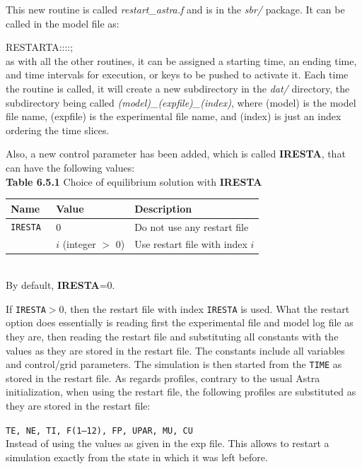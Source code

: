This new routine is called {\it restart\_astra.f} and is in the {\it sbr/} 
package. 
It can be called in the model file as:

RESTARTA::::;
\\
as with all the other routines, it can be assigned a starting time, an ending 
time, and time intervals for execution, or keys to be pushed to activate it.
Each time the routine is called, it will create a new subdirectory in the {\it 
dat/} directory, the subdirectory being called {\it 
(model)\_(expfile)\_(index)}, where (model) is the model file name, (expfile) 
is the experimental file name, and (index) is just an index ordering the time 
slices.

Also, a new control parameter has been added, which is called {\bf IRESTA}, that can have the following values:
\\
{\bf Table 6.5.1} Choice of equilibrium solution with {\bf IRESTA}\\[2ex]
\begin{tabular}{|l|l|l|}					\hline
\bf Name	&\bf Value & Description\\ \hline
\tt IRESTA 	& 0 & Do not use any restart file\\
\tt  	& $i$ (integer $>$ 0) &  Use restart file with index $i$\\ 
\hline
\end{tabular}
\bigskip\\
By default, {\bf IRESTA}=0.

If {\tt IRESTA}$>$0, then the restart file with index {\tt IRESTA} is used. What
the restart option does essentially is reading first the experimental file and 
model log file as they are, then reading the restart file and substituting all 
constants with the values as they are stored in the restart file. The constants 
include all variables and control/grid parameters. The simulation is then 
started from the {\tt TIME} as stored in the restart file.
As regards profiles, contrary to the usual Astra initialization, when using the restart 
file, the following profiles are substituted as they are stored in the restart 
file:

{\tt TE, NE, TI, F(1--12), FP, UPAR, MU, CU}\\
Instead of using the values as given in the exp file. This allows to restart a simulation exactly from the state in which it was left before.
%
\clearpage
